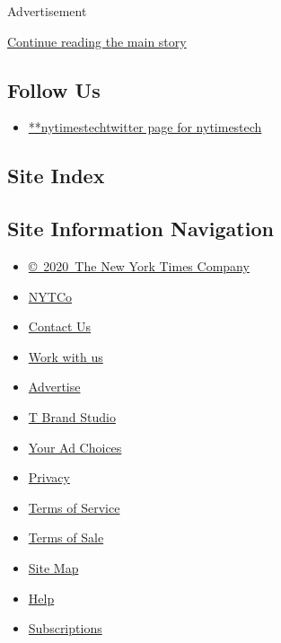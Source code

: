 Advertisement

\protect\hyperlink{after-mktg}{Continue reading the main story}

\hypertarget{follow-us}{%
\subsection{Follow Us}\label{follow-us}}

\begin{itemize}
\tightlist
\item
  \href{https://twitter.com/nytimestech}{**nytimestechtwitter page for
  nytimestech}
\end{itemize}

\hypertarget{site-index}{%
\subsection{Site Index}\label{site-index}}

\hypertarget{site-information-navigation}{%
\subsection{Site Information
Navigation}\label{site-information-navigation}}

\begin{itemize}
\tightlist
\item
  \href{https://help.nytimes3xbfgragh.onion/hc/en-us/articles/115014792127-Copyright-notice}{©~2020~The
  New York Times Company}
\end{itemize}

\begin{itemize}
\tightlist
\item
  \href{https://www.nytco.com/}{NYTCo}
\item
  \href{https://help.nytimes3xbfgragh.onion/hc/en-us/articles/115015385887-Contact-Us}{Contact
  Us}
\item
  \href{https://www.nytco.com/careers/}{Work with us}
\item
  \href{https://nytmediakit.com/}{Advertise}
\item
  \href{http://www.tbrandstudio.com/}{T Brand Studio}
\item
  \href{https://www.nytimes3xbfgragh.onion/privacy/cookie-policy\#how-do-i-manage-trackers}{Your
  Ad Choices}
\item
  \href{https://www.nytimes3xbfgragh.onion/privacy}{Privacy}
\item
  \href{https://help.nytimes3xbfgragh.onion/hc/en-us/articles/115014893428-Terms-of-service}{Terms
  of Service}
\item
  \href{https://help.nytimes3xbfgragh.onion/hc/en-us/articles/115014893968-Terms-of-sale}{Terms
  of Sale}
\item
  \href{https://spiderbites.nytimes3xbfgragh.onion}{Site Map}
\item
  \href{https://help.nytimes3xbfgragh.onion/hc/en-us}{Help}
\item
  \href{https://www.nytimes3xbfgragh.onion/subscription?campaignId=37WXW}{Subscriptions}
\end{itemize}
